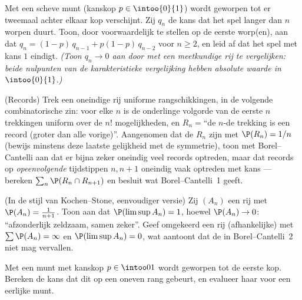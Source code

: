 \begin{exercise}[$\star\star$]\label{exo:b2:proba:6}
Met een scheve munt (kanskop $p \in \intoo{0}{1}$) wordt geworpen
tot er tweemaal achter elkaar kop verschijnt. Zij $q_n$ de kans dat
het spel langer dan $n$ worpen duurt. Toon, door voorwaardelijk te
stellen op de eerste worp(en), aan dat $q_n = (1-p)\,q_{n-1} +
p(1-p)\,q_{n-2}$ voor $n \geq 2$, en leid af dat het spel met kans
$1$ eindigt. \emph{(Toon $q_n \to 0$ aan door met een meetkundige
rij te vergelijken: beide nulpunten van de karakteristieke
vergelijking hebben absolute waarde in $\intoo{0}{1}$.)}
\end{exercise}

\begin{exercise}[$\star\star\star$]\label{exo:b2:proba:7}
(Records) Trek een oneindige rij  uniforme
rangschikkingen, in de volgende combinatorische zin: voor elke $n$
is de onderlinge volgorde van de eerste $n$ trekkingen uniform over
de $n!$ mogelijkheden, en $R_n = {}$``de $n$-de trekking is een
record (groter dan alle vorige)''. Aangenomen dat de 
$R_n$  zijn met $\P(R_n) = 1/n$ (bewijs minstens deze
laatste gelijkheid met de symmetrie), toon met Borel--Cantelli aan
dat er bijna zeker oneindig veel records optreden, maar dat records
op \emph{opeenvolgende} tijdstippen $n, n+1$ oneindig vaak optreden
met kans --- bereken $\sum_n \P(R_n \cap R_{n+1})$ en besluit wat
Borel--Cantelli~1 geeft.
\end{exercise}

\begin{exercise}[$\star\star\star$]\label{exo:b2:proba:8}
(In de stijl van Kochen--Stone, eenvoudiger versie) Zij $(A_n)$ een
rij  met $\P(A_n) = \frac{1}{n+1}$.
Toon aan dat $\P(\limsup A_n) = 1$, hoewel $\P(A_n) \to 0$:
``afzonderlijk zeldzaam, samen zeker''. Geef omgekeerd een rij
(afhankelijke)  met $\sum\P(A_n) = \infty$ en
$\P(\limsup A_n) = 0$, wat aantoont dat de  in
Borel--Cantelli~2 niet mag vervallen.
\end{exercise}

\begin{exercise}[$\star$]\label{exo:b2:proba:9}
Met een munt met kanskop $p \in \intoo01$ wordt geworpen tot de
eerste kop. Bereken de kans dat dit op een oneven rang gebeurt, en
evalueer haar voor een eerlijke munt.
\end{exercise}

